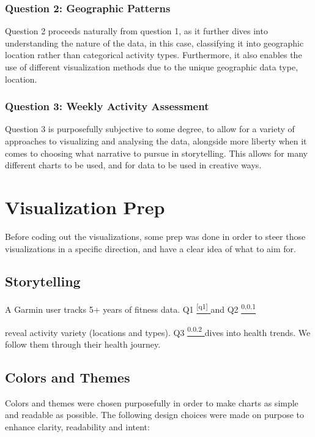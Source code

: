 \documentclass[a4paper,11pt]{article}
\newcommand*{\sref}[1]{%
  \hyperref[{#1}]{%
    \color{accent}\textsuperscript{\ref*{#1}}%
  }%
}
\begin{document}
\subsubsection{Question 2: Geographic Patterns}\label{q2}

\par
Question 2 proceeds naturally from question 1, as it further dives into
understanding the nature of the data, in this case, classifying it into
geographic location rather than categorical activity types. Furthermore, it
also enables the use of different visualization methods due to the unique
geographic data type, location.

\subsubsection{Question 3: Weekly Activity Assessment}\label{q3}

\par
Question 3 is purposefully subjective to some degree, to allow for a variety of
approaches to visualizing and analysing the data, alongside more liberty when
it comes to choosing what narrative to pursue in storytelling. This allows for
many different charts to be used, and for data to be used in creative ways.

\section{Visualization Prep}

\par
Before coding out the visualizations, some prep was done in order to steer
those visualizations in a specific direction, and have a clear idea of what to
aim for.

\subsection{Storytelling}

\par
A Garmin user tracks 5+ years of fitness data. Q1\sref{q1} and Q2\sref{q2}
reveal activity variety (locations and types). Q3\sref{q3} dives into health
trends. We follow them through their health journey.

\subsection{Colors and Themes}\label{colors}

\par
Colors and themes were chosen purposefully in order to make charts as simple
and readable as possible. The following design choices were made on purpose to
enhance clarity, readability and intent:
\end{document}
